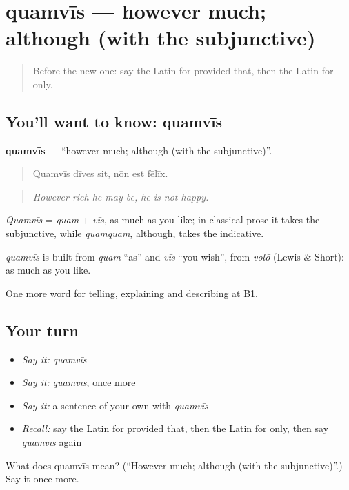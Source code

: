 \section[quamvīs]{quamvīs — however much; although (with the subjunctive)}

\label{lesson:LA-C390-quamvis}



\begin{quote}
Before the new one: say the Latin for provided that, then the Latin for only.
\end{quote}

\subsection*{You'll want to know: quamvīs}
\textbf{quamvīs} — \textquotedblleft{}however much; although (with the subjunctive)\textquotedblright{}.

\begin{quote}
Quamvīs dīves sit, nōn est fēlīx.
\end{quote}

\begin{quote}
\emph{However rich he may be, he is not happy.}
\end{quote}

\emph{Quamvīs} = \emph{quam} + \emph{vīs}, as much as you like; in classical prose it takes the subjunctive, while \emph{quamquam}, although, takes the indicative.

\begin{cousinweb}
\emph{quamvīs} is built from \emph{quam} \textquotedblleft{}as\textquotedblright{} and \emph{vīs} \textquotedblleft{}you wish\textquotedblright{}, from \emph{volō} (Lewis \& Short): as much as you like.
\end{cousinweb}

\begin{grammarlens}[title={What you've built}]
One more word for telling, explaining and describing at B1.
\end{grammarlens}

\subsection*{Your turn}
\begin{itemize}
\raggedright
  \item \emph{Say it:} \emph{quamvīs}
  \item \emph{Say it:} \emph{quamvīs}, once more
  \item \emph{Say it:} a sentence of your own with \emph{quamvīs}
  \item \emph{Recall:} say the Latin for provided that, then the Latin for only, then say \emph{quamvīs} again
\end{itemize}

\begin{tcolorbox}[breakable,colback=teal!4,colframe=teal!35!black,title={Before you move on}]
What does quamvīs mean? (\textquotedblleft{}However much; although (with the subjunctive)\textquotedblright{}.) Say it once more.
\end{tcolorbox}
